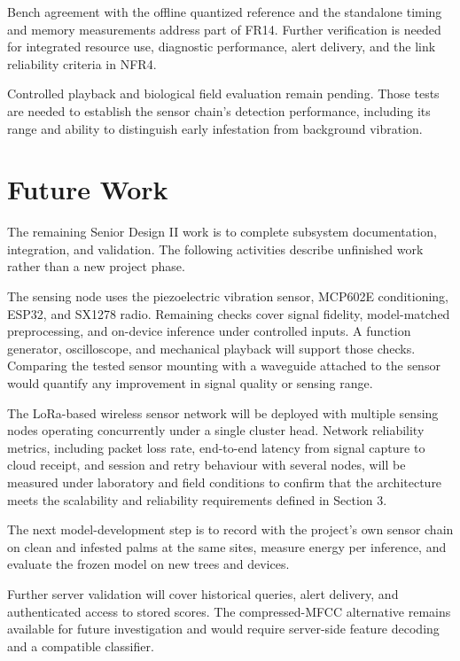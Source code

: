 \documentclass[12pt,a4paper,oneside]{memoir}
\newcommand{\newrevision}[1]{#1}
\begin{document}
\newrevision{Bench agreement with the offline quantized reference and the standalone timing and memory measurements address part of FR14. Further verification is needed for integrated resource use, diagnostic performance, alert delivery, and the link reliability criteria in NFR4.}

\newrevision{Controlled playback and biological field evaluation remain pending. Those tests are needed to establish the sensor chain's detection performance, including its range and ability to distinguish early infestation from background vibration.}

\section{Future Work}
\label{sec:futurework}

\newrevision{The remaining Senior Design II work is to complete subsystem documentation, integration, and validation. The following activities describe unfinished work rather than a new project phase.}

\newrevision{The sensing node uses the piezoelectric vibration sensor, MCP602E conditioning, ESP32, and SX1278 radio. Remaining checks cover signal fidelity, model-matched preprocessing, and on-device inference under controlled inputs. A function generator, oscilloscope, and mechanical playback will support those checks. Comparing the tested sensor mounting with a waveguide attached to the sensor would quantify any improvement in signal quality or sensing range.}

The LoRa-based wireless sensor network will be deployed with multiple sensing nodes operating concurrently under a single cluster head. Network reliability metrics, including packet loss rate, end-to-end latency from signal capture to cloud receipt, and session and retry behaviour with several nodes, will be measured under laboratory and field conditions to confirm that the architecture meets the scalability and reliability requirements defined in Section 3.

\newrevision{The next model-development step is to record with the project's own sensor chain on clean and infested palms at the same sites, measure energy per inference, and evaluate the frozen model on new trees and devices.}

\newrevision{Further server validation will cover historical queries, alert delivery, and authenticated access to stored scores. The compressed-MFCC alternative remains available for future investigation and would require server-side feature decoding and a compatible classifier.}
\end{document}
